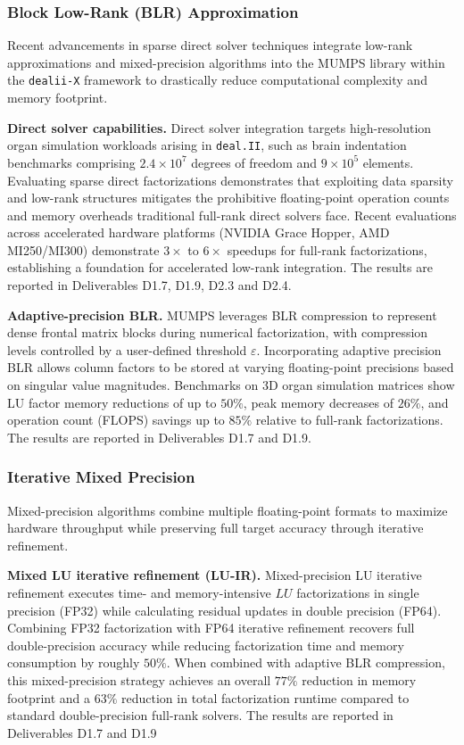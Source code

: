 \documentclass[a4paper,12pt, numbers]{article}
\newcommand{\dealii}{\texttt{deal.II}}
\begin{document}
\subsubsection*{Block Low-Rank (BLR) Approximation}

\noindent Recent advancements in sparse direct solver techniques integrate low-rank approximations and mixed-precision algorithms into the MUMPS library within the \texttt{dealii-X} framework to drastically reduce computational complexity and memory footprint.

\noindent\textbf{Direct solver capabilities.}
Direct solver integration targets high-resolution organ simulation workloads arising in \dealii{}, such as brain indentation benchmarks comprising $2.4\times 10^7$ degrees of freedom and $9 \times 10^5$ elements. Evaluating sparse direct factorizations demonstrates that exploiting data sparsity and low-rank structures mitigates the prohibitive floating-point operation counts and memory overheads traditional full-rank direct solvers face. Recent evaluations across accelerated hardware platforms (NVIDIA Grace Hopper, AMD MI250/MI300) demonstrate $3\times$ to $6\times$ speedups for full-rank factorizations, establishing a foundation for accelerated low-rank integration. The results are reported in Deliverables D1.7, D1.9, D2.3 and D2.4.

\noindent\textbf{Adaptive-precision BLR.}
MUMPS leverages BLR compression to represent dense frontal matrix blocks during numerical factorization, with compression levels controlled by a user-defined threshold $\varepsilon$. Incorporating adaptive precision BLR allows column factors to be stored at varying floating-point precisions based on singular value magnitudes. Benchmarks on 3D organ simulation matrices show LU factor memory reductions of up to $50\%$, peak memory decreases of $26\%$, and operation count (FLOPS) savings up to $85\%$ relative to full-rank factorizations. The results are reported in Deliverables D1.7 and D1.9.

\subsubsection*{Iterative Mixed Precision}

\noindent Mixed-precision algorithms combine multiple floating-point formats to maximize hardware throughput while preserving full target accuracy through iterative refinement.

\noindent\textbf{Mixed LU iterative refinement (LU-IR).}
Mixed-precision LU iterative refinement executes time- and memory-intensive $LU$ factorizations in single precision (FP32) while calculating residual updates in double precision (FP64). Combining FP32 factorization with FP64 iterative refinement recovers full double-precision accuracy while reducing factorization time and memory consumption by roughly $50\%$. When combined with adaptive BLR compression, this mixed-precision strategy achieves an overall $77\%$ reduction in memory footprint and a $63\%$ reduction in total factorization runtime compared to standard double-precision full-rank solvers. The results are reported in Deliverables D1.7 and D1.9
\newpage
\end{document}
